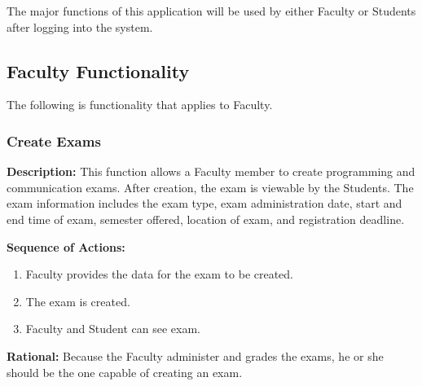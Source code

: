 
\label{sec:product_functions}


The major functions of this application will be used by either Faculty or Students
after logging into the system.

\subsection{Faculty Functionality}
The following is functionality that applies to Faculty.

   \subsubsection{\large Create Exams} 
   \begin{boxed} %
      \textbf{Description:}
      This function allows a Faculty member to create programming and
      communication exams. After creation, the exam is viewable by the Students.
      The exam information includes the exam type, exam administration date,
      start and end time of exam, semester offered, location of exam, and
      registration deadline. 
      
      \vspace{3mm}
      \textbf{Sequence of Actions:}
      \begin{enumerate}
            
         \item Faculty provides the data for the exam to be created.
         \item The exam is created.
         \item Faculty and Student can see exam.
      \end{enumerate}

      \textbf{Rational:}
      Because the Faculty administer and grades the exams, he or she should
      be the one capable of creating an exam.
   \end{boxed} %

